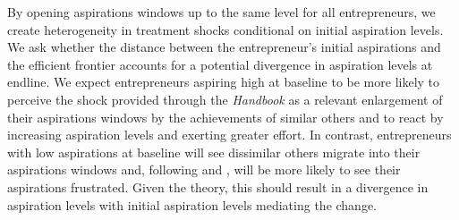 \documentclass[11.5pt]{article}
\begin{document}
By opening aspirations windows up to the same level for all entrepreneurs, we create heterogeneity in treatment shocks conditional on initial aspiration levels. We ask whether the distance between the entrepreneur's initial aspirations and the efficient frontier accounts for a potential divergence in aspiration levels at endline. We expect entrepreneurs aspiring high at baseline to be more likely to perceive the shock provided through the \emph{Handbook} as a relevant enlargement of their aspirations windows by the achievements of similar others and to react by increasing aspiration levels and exerting greater effort. In contrast, entrepreneurs with low aspirations at baseline will see dissimilar others migrate into their aspirations windows and, following \citet{Ray2006} and \citet{Genicot2017}, will be more likely to see their aspirations frustrated. Given the theory, this should result in a divergence in aspiration levels with initial aspiration levels mediating the change. %

\end{document}
